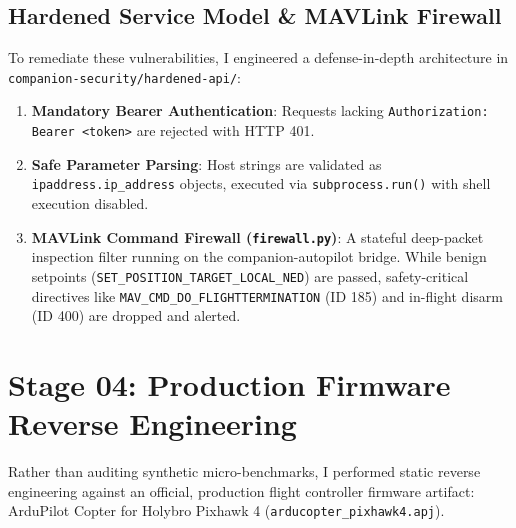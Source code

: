 \documentclass[11pt,a4paper]{article}
\begin{document}
\subsection{Hardened Service Model \& MAVLink Firewall}
To remediate these vulnerabilities, I engineered a defense-in-depth architecture in \texttt{companion-security/hardened-api/}:
\begin{enumerate}
    \item \textbf{Mandatory Bearer Authentication}: Requests lacking \texttt{Authorization: Bearer <token>} are rejected with HTTP 401.
    \item \textbf{Safe Parameter Parsing}: Host strings are validated as \texttt{ipaddress.ip\_address} objects, executed via \texttt{subprocess.run()} with shell execution disabled.
    \item \textbf{MAVLink Command Firewall (\texttt{firewall.py})}: A stateful deep-packet inspection filter running on the companion-autopilot bridge. While benign setpoints (\texttt{SET\_POSITION\_TARGET\_LOCAL\_NED}) are passed, safety-critical directives like \texttt{MAV\_CMD\_DO\_FLIGHTTERMINATION} (ID 185) and in-flight disarm (ID 400) are dropped and alerted.
\end{enumerate}

\section{Stage 04: Production Firmware Reverse Engineering}
Rather than auditing synthetic micro-benchmarks, I performed static reverse engineering against an official, production flight controller firmware artifact: ArduPilot Copter for Holybro Pixhawk 4 (\texttt{arducopter\_pixhawk4.apj}).
\end{document}
